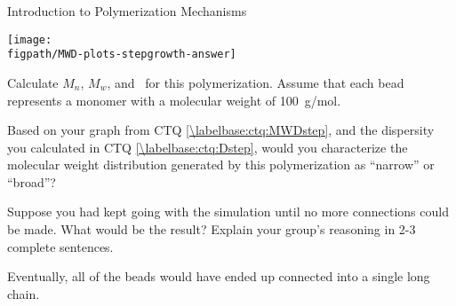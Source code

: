 \begin{activity}{Introduction to Polymerization Mechanisms}
\begin{ctqs}
\begin{solution}[3in]
{			\centerline{\texttt{[image: \\figpath/MWD-plots-stepgrowth-answer]}}
		}
		\end{solution}
	
	\question Calculate $M_n$, $M_w$, and \PDItext\ for this polymerization.  Assume that each bead represents a monomer with a molecular weight of 100~g/mol. \label{\labelbase:ctq:Dstep}
	
		\begin{solution}[3in]\studentdisplay{~}\end{solution}
	
	\question Based on your graph from CTQ \ref{\labelbase:ctq:MWDstep}, and the dispersity you calculated in CTQ \ref{\labelbase:ctq:Dstep}, would you characterize the molecular weight distribution generated by this polymerization as ``narrow'' or ``broad''?  %
	
		\begin{solution}[0.75in]\studentdisplay{~}\end{solution}
	
	\question Suppose you had kept going with the simulation until no more  connections could be made.  What would be the result?  Explain your group's reasoning in 2-3 complete sentences.
	
		\begin{solution}[1.75in]
			Eventually, all of the beads would have ended up connected into a single long chain.
		\end{solution}
	

\end{ctqs}
\end{activity}
